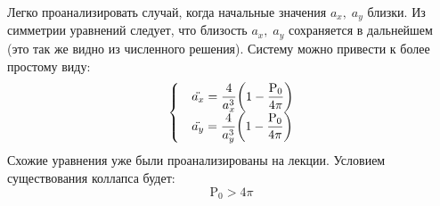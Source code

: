 \documentclass[titlepage]{article}
\begin{document}
\par Легко проанализировать случай, когда начальные значения $a_x,\; a_y$ близки. Из симметрии уравнений следует, что близость $a_x,\; a_y$ сохраняется в дальнейшем (это так же видно из численного решения). Систему можно привести к более простому виду:
\begin{align}
 \begin{cases}
 &\ddot{a_x} = \dfrac{4}{a_x^3} \qty(1 - \dfrac{\mathrm{P_0}}{4\pi})\\
 &\ddot{a_y} = \dfrac{4}{a_y^3} \qty(1 - \dfrac{\mathrm{P_0}}{4\pi} )
 \end{cases}
\end{align}
Схожие уравнения уже были проанализированы на лекции. Условием существования коллапса будет:
\begin{equation}
\mathrm{P_0} > 4 \pi 
\end{equation}
%
%
\end{document}
